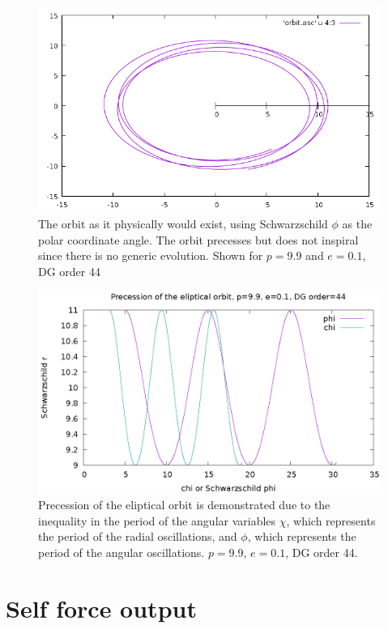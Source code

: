 \begin{figure}
  \includegraphics{orbitevolvedg44p99e01}
  \caption{The orbit as it physically would exist, using Schwarzschild $\phi$ as the polar coordinate angle. The orbit precesses but does not inspiral since there is no generic evolution. Shown for $p=9.9$ and $e=0.1$, DG order 44}
  \label{phiorb}
\end{figure}


\begin{figure}
  \includegraphics{precessiondg44p99e01}
  \caption{Precession of the eliptical orbit is demonstrated due to the inequality in the period of the angular variables $\chi$, which represents the period of the radial oscillations, and $\phi$, which represents the period of the angular oscillations. $p=9.9$, $e=0.1$, DG order 44.}
  \label{precession}
\end{figure}

\section{Self force output}

